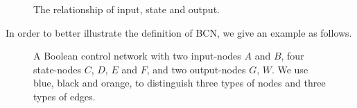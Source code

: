  \begin{figure}[thpb]
      \centering
      
      \caption{The relationship of input, state and output.}
      \label{fig:10}
  \end{figure}

In order to better illustrate the definition of BCN, we give an example as follows.


 
 \begin{figure}[thpb]
      \centering
      
      \caption{A Boolean control network with two input-nodes $A$ and $B$, four state-nodes $C$, $D$, $E$ and $F$, and two output-nodes $G$, $W$. We use blue, black and orange, to distinguish three types of nodes and three types of edges.}
      \label{fig:1}
  \end{figure}


